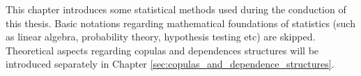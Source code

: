 
This chapter introduces some statistical methods used during the conduction of this thesis. Basic notations regarding mathematical foundations of statistics (such as linear algebra, probability theory, hypothesis testing etc) are skipped. Theoretical aspects regarding copulas and dependences structures will be introduced separately in Chapter \ref{sec:copulas_and_dependence_structures}.

